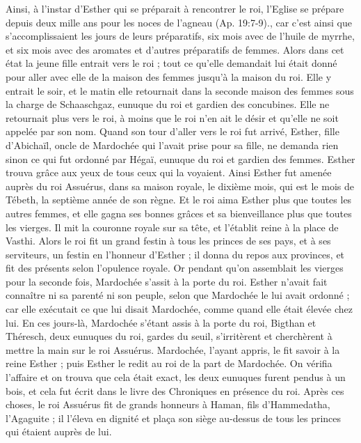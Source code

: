 \begin{multicols}{2}
{Ainsi, à l’instar d’Esther qui se préparait à rencontrer le roi, l’Eglise se prépare depuis deux mille ans pour les noces de l’agneau (Ap. 19:7-9).}, car c’est ainsi que s’accomplissaient les jours de leurs préparatifs, six mois avec de l’huile de myrrhe, et six mois avec des aromates et d’autres préparatifs de femmes.
 Alors dans cet état la jeune fille entrait vers le roi ; tout ce qu’elle demandait lui était donné pour aller avec elle de la maison des femmes jusqu’à la maison du roi.
Elle y entrait le soir, et le matin elle retournait dans la seconde maison des femmes sous la charge de Schaaschgaz, eunuque du roi et gardien des concubines. Elle ne retournait plus vers le roi, à moins que le roi n’en ait le désir et qu'elle ne soit appelée par son nom.
Quand son tour d’aller vers le roi fut arrivé, Esther, fille d'Abichaïl, oncle de Mardochée qui l’avait prise pour sa fille, ne demanda rien sinon ce qui fut ordonné par Hégaï, eunuque du roi et gardien des femmes. Esther trouva grâce aux yeux de tous ceux qui la voyaient.
Ainsi Esther fut amenée auprès du roi Assuérus, dans sa maison royale, le dixième mois, qui est le mois de Tébeth, la septième année de son règne.
Et le roi aima Esther plus que toutes les autres femmes, et elle gagna ses bonnes grâces et sa bienveillance plus que toutes les vierges. Il mit la couronne royale sur sa tête, et l'établit reine à la place de Vasthi.
Alors le roi fit un grand festin à tous les princes de ses pays, et à ses serviteurs, un festin en l’honneur d'Esther ; il donna du repos aux provinces, et fit des présents selon l’opulence royale.
Or pendant qu'on assemblait les vierges pour la seconde fois, Mardochée s’assit à la porte du roi.
Esther n’avait fait connaître ni sa parenté ni son peuple, selon que Mardochée le lui avait ordonné ; car elle exécutait ce que lui disait Mardochée, comme quand elle était élevée chez lui.
En ces jours-là, Mardochée s’étant assis à la porte du roi, Bigthan et Théresch, deux eunuques du roi, gardes du seuil, s’irritèrent et cherchèrent à mettre la main sur le roi Assuérus.
Mardochée, l'ayant appris, le fit savoir à la reine Esther ; puis Esther le redit au roi de la part de Mardochée.
On vérifia l’affaire et on trouva que cela était exact, les deux eunuques furent pendus à un bois, et cela fut écrit dans le livre des Chroniques en présence du roi.
\VerseOne{}Après ces choses, le roi Assuérus fit de grands honneurs à Haman, fils d'Hammedatha, l’Agaguite ; il l'éleva en dignité et plaça son siège au-dessus de tous les princes qui étaient auprès de lui.

\end{multicols}
